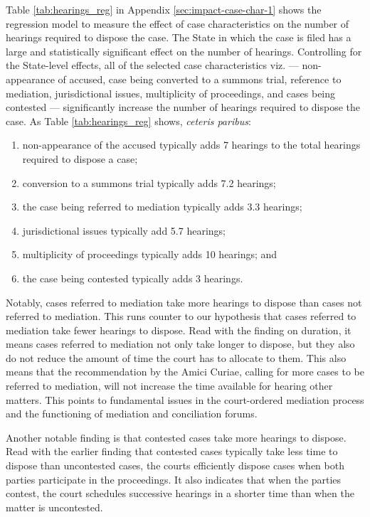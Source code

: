 Table \ref{tab:hearings_reg} in Appendix \ref{sec:impact-case-char-1} shows the regression model to measure the effect of case characteristics on the number of hearings required to dispose the case. The State in which the case is filed has a large and statistically significant effect on the number of hearings. Controlling for the State-level effects, all of the selected case characteristics viz. --- non-appearance of accused, case being converted to a summons trial, reference to mediation, jurisdictional issues, multiplicity of proceedings, and cases being contested --- significantly increase the number of hearings required to dispose the case. As Table \ref{tab:hearings_reg} shows, \emph{ceteris paribus}:

\begin{enumerate}
\item non-appearance of the accused typically adds 7 hearings to the total hearings required to dispose a case;
\item conversion to a summons trial typically adds 7.2 hearings;
\item the case being referred to mediation typically adds 3.3 hearings;
\item jurisdictional issues typically add 5.7 hearings;
\item multiplicity of proceedings typically adds 10 hearings; and
\item the case being contested typically adds 3 hearings.
\end{enumerate}

Notably, cases referred to mediation take more hearings to dispose than cases not referred to mediation. This runs counter to our hypothesis that cases referred to mediation take fewer hearings to dispose. Read with the finding on duration, it means cases referred to mediation not only take longer to dispose, but they also do not reduce the amount of time the court has to allocate to them. This also means that the recommendation by the Amici Curiae, calling for more cases to be referred to mediation, will not increase the time available for hearing other matters. This points to fundamental issues in the court-ordered mediation process and the functioning of mediation and conciliation forums.

Another notable finding is that contested cases take more hearings to dispose. Read with the earlier finding that contested cases typically take less time to dispose than uncontested cases, the courts efficiently dispose cases when both parties participate in the proceedings. It also indicates that when the parties contest, the court schedules successive hearings in a shorter time than when the matter is uncontested.

